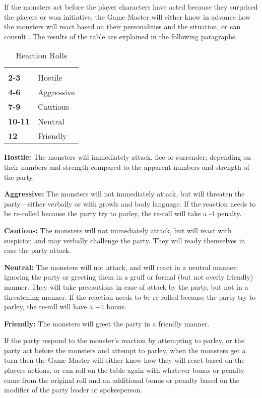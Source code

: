 \begin{multicols*}{2}
If the monsters act before the player characters have acted because they surprised the players or won initiative, the Game Master will either know in advance how the monsters will react based on their personalities and the situation, or can consult . The results of the table are explained in the following paragraphs.

\begin {table}[H]
  \caption{Reaction Rolls}\label{tab:Reaction Rolls}
  \begin{tabularx}{\columnwidth}{>{\bfseries}YY}
	 & \\
	2-3 & Hostile\\
	4-6 & Aggressive\\
	7-9 & Cautious\\
	10-11 & Neutral\\
	12 & Friendly
  \end {tabularx}
\end {table}

\textbf{Hostile:} The monsters will immediately attack, flee or surrender; depending on their numbers and strength compared to the apparent numbers and strength of the party.

\textbf{Aggressive:} The monsters will not immediately attack, but will threaten the party—either verbally or with growls and body language. If the reaction needs to be re-rolled because the party try to parley, the re-roll will take a -4 penalty.

\textbf{Cautious:} The monsters will not immediately attack, but will react with suspicion and may verbally challenge the party. They will ready themselves in case the party attack.

\textbf{Neutral:} The monsters will not attack, and will react in a neutral manner; ignoring the party or greeting them in a gruff or formal (but not overly friendly) manner. They will take precautions in case of attack by the party, but not in a threatening manner. If the reaction needs to be re-rolled because the party try to parley, the re-roll will have a +4 bonus.

\textbf{Friendly:} The monsters will greet the party in a friendly manner.

If the party respond to the monster’s reaction by attempting to parley, or the party act before the monsters and attempt to parley, when the monsters get a turn then the Game Master will either know how they will react based on the players actions, or can roll on the table again with whatever bonus or penalty came from the original roll and an additional bonus or penalty based on the  modifier of the party leader or spokesperson.


\end{multicols*}
